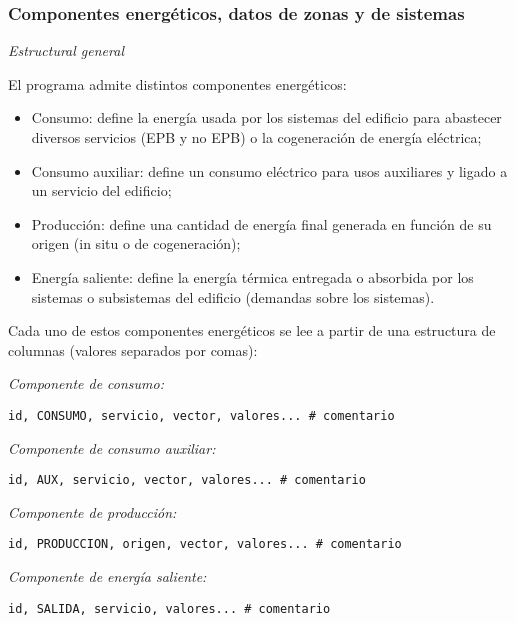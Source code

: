 \documentclass[10pt,notitlepage,oneside,a4paper]{article}
\begin{document}
\subsubsection{Componentes energéticos, datos de zonas y de sistemas}\label{sec:componentesenergeticos}

\textit{Estructural general}

El programa admite distintos componentes energéticos:

\begin{itemize}
    \item Consumo: define la energía usada por los sistemas del edificio para abastecer diversos servicios (EPB y no EPB) o la cogeneración de energía eléctrica;
    \item Consumo auxiliar: define un consumo eléctrico para usos auxiliares y ligado a un servicio del edificio;
    \item Producción: define una cantidad de energía final generada en función de su origen (in situ o de cogeneración);
    \item Energía saliente: define la energía térmica entregada o absorbida por los sistemas o subsistemas del edificio (demandas sobre los sistemas).
\end{itemize}

Cada uno de estos componentes energéticos se lee a partir de una estructura de columnas (valores separados por comas):

\textit{Componente de consumo:}

\begin{lstlisting}
id, CONSUMO, servicio, vector, valores... # comentario
\end{lstlisting}

\textit{Componente de consumo auxiliar:}

\begin{lstlisting}
id, AUX, servicio, vector, valores... # comentario
\end{lstlisting}

\textit{Componente de producción:}

\begin{lstlisting}
id, PRODUCCION, origen, vector, valores... # comentario
\end{lstlisting}

\textit{Componente de energía saliente:}

\begin{lstlisting}
id, SALIDA, servicio, valores... # comentario
\end{lstlisting}
\end{document}
